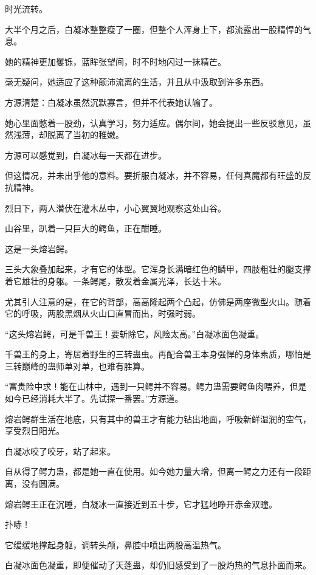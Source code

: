 
\begin{this_body}

时光流转。

大半个月之后，白凝冰整整瘦了一圈，但整个人浑身上下，都流露出一股精悍的气息。

她的精神更加矍铄，蓝眸张望间，时不时地闪过一抹精芒。

毫无疑问，她适应了这种颠沛流离的生活，并且从中汲取到许多东西。

方源清楚：白凝冰虽然沉默寡言，但并不代表她认输了。

她心里面憋着一股劲，认真学习，努力适应。偶尔间，她会提出一些反驳意见，虽然浅薄，却脱离了当初的稚嫩。

方源可以感觉到，白凝冰每一天都在进步。

但这情况，并未出乎他的意料。要折服白凝冰，并不容易，任何真魔都有旺盛的反抗精神。

烈日下，两人潜伏在灌木丛中，小心翼翼地观察这处山谷。

山谷里，趴着一只巨大的鳄鱼，正在酣睡。

这是一头熔岩鳄。

三头大象叠加起来，才有它的体型。它浑身长满暗红色的鳞甲，四肢粗壮的腿支撑着它雄壮的身躯。一条鳄尾，散发着金属光泽，长达十米。

尤其引人注意的是，在它的背部，高高隆起两个凸起，仿佛是两座微型火山。随着它的呼吸，两股黑烟从火山口直冒而出，时强时弱。

“这头熔岩鳄，可是千兽王！要斩除它，风险太高。”白凝冰面色凝重。

千兽王的身上，寄居着野生的三转蛊虫。再配合兽王本身强悍的身体素质，哪怕是三转巅峰的蛊师单对单，也难有胜算。

“富贵险中求！能在山林中，遇到一只鳄并不容易。鳄力蛊需要鳄鱼肉喂养，但是如今已经消耗大半了。先试探一番罢。”方源道。

熔岩鳄群生活在地底，只有其中的兽王才有能力钻出地面，呼吸新鲜湿润的空气，享受烈日阳光。

白凝冰咬了咬牙，站了起来。

自从得了鳄力蛊，都是她一直在使用。如今她力量大增，但离一鳄之力还有一段距离，没有圆满。

熔岩鳄王正在沉睡，白凝冰一直接近到五十步，它才猛地睁开赤金双瞳。

扑哧！

它缓缓地撑起身躯，调转头颅，鼻腔中喷出两股高温热气。

白凝冰面色凝重，即便催动了天蓬蛊，却仍旧感受到了一股灼热的气息扑面而来。


\end{this_body}
